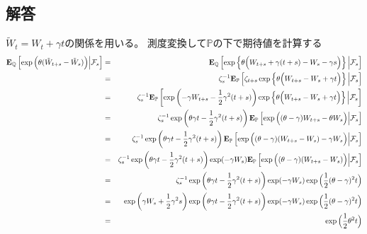 \documentclass[uplatex,a4j,12pt,dvipdfmx]{jsarticle}
\begin{document}
\subsection{解答}

$\tilde{W}_{t} = W_{t} + \gamma t$の関係を用いる。
測度変換して$\mathbb{P}$の下で期待値を計算する
%
\begin{eqnarray*}
	{\bf E}_{\mathbb{Q}}
	\left[ \exp \Big( \theta (\tilde{W}_{t+s} - \tilde{W}_{s}) \Big) \Big| \mathcal{F}_{s} \right]
	&=&
	{\bf E}_{\mathbb{Q}}
	\left[ \exp
		\left\{
		\theta \Big( W_{t+s} + \gamma (t+s) - W_{s} - \gamma s \Big)
		\right\}
		\Big| \mathcal{F}_{s} \right]
	\\ &=&
	\zeta_{s}^{-1}
	{\bf E}_{\mathbb{P}}
	\left[ \zeta_{t+s} \exp \left\{ \theta \Big( W_{t+s} - W_{s} + \gamma t \Big) \right\} \Big| \mathcal{F}_{s} \right]
	\\ &=&
	\zeta_{s}^{-1}
	{\bf E}_{\mathbb{P}}
	\left[ \exp \left( - \gamma W_{t+s} - \dfrac{1}{2} \gamma^{2} (t+s) \right) \exp \left\{ \theta \Big( W_{t+s} - W_{s} + \gamma t \Big) \right\} \Big| \mathcal{F}_{s} \right]
	\\ &=&
	\zeta_{s}^{-1}
	\exp \left( \theta \gamma t - \dfrac{1}{2} \gamma^{2} (t+s) \right)
	{\bf E}_{\mathbb{P}}
	\left[ \exp \Big( ( \theta - \gamma ) W_{t+s} - \theta W_{s} \Big) \Big| \mathcal{F}_{s} \right]
	\\ &=&
	\zeta_{s}^{-1}
	\exp \left( \theta \gamma t - \dfrac{1}{2} \gamma^{2} (t+s) \right)
	{\bf E}_{\mathbb{P}}
	\left[ \exp \Big( ( \theta - \gamma ) ( W_{t+s} - W_{s} ) - \gamma W_{s} \Big) \Big| \mathcal{F}_{s} \right]
	\\ &=&
	\zeta_{s}^{-1}
	\exp \left( \theta \gamma t - \dfrac{1}{2} \gamma^{2} (t+s) \right)
	\exp ( - \gamma W_{s} )
	{\bf E}_{\mathbb{P}}
	\left[ \exp \Big( ( \theta - \gamma ) ( W_{t+s} - W_{s} ) \Big) \Big| \mathcal{F}_{s} \right]
	\\ &=&
	\zeta_{s}^{-1}
	\exp \left( \theta \gamma t - \dfrac{1}{2} \gamma^{2} (t+s) \right)
	\exp ( - \gamma W_{s} )
	\exp \Big( \dfrac{1}{2} (\theta - \gamma)^{2} t \Big)
	\\ &=&
	\exp \left( \gamma W_{s} + \dfrac{1}{2} \gamma^{2} s \right)
	\exp \left( \theta \gamma t - \dfrac{1}{2} \gamma^{2} (t+s) \right)
	\exp ( - \gamma W_{s} )
	\exp \Big( \dfrac{1}{2} (\theta - \gamma)^{2} t \Big)
	\\ &=&
	\exp \Big( \dfrac{1}{2} \theta^{2} t \Big)
\end{eqnarray*}
%

${}$
\end{document}

